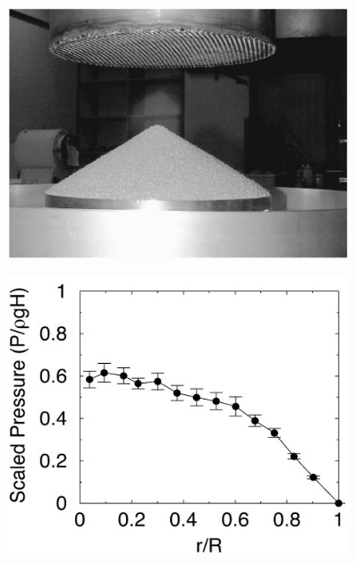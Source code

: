 \begin{figure}
    \begin{minipage}{.45\linewidth}
        \centering
        \includegraphics[width=0.9\textwidth]{04-figuras/Sand_Pile_RL_Experiment.png}
        \label{fig:pressure_pile:RL}
    \end{minipage}
    \begin{minipage}{.45\linewidth}
        \centering
        \includegraphics[width=0.9\textwidth]{04-figuras/Sand_Pile_RL_Pressure.png}
        \label{fig:pressure_response:RL}
    \end{minipage}

\end{figure}
